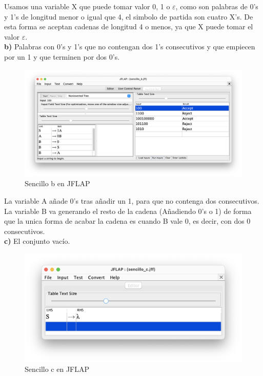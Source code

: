 Usamos una variable X que puede tomar valor 0, 1 o $\varepsilon$, como son palabras de 0's y 1's de longitud menor o igual que 4, 
el simbolo de partida son cuatro X's. De esta forma se aceptan cadenas de longitud 4 o menos, ya que X puede tomar el valor $\varepsilon$. \\

\textbf{b)}  Palabras con 0's y 1's que no contengan dos 1's consecutivos y que empiecen por un 1 y que terminen por dos 0's.

\begin{figure}[H] 
	\centering
	\includegraphics[scale=0.35]{../practica_1/images/sencillo_b.png} 
	\caption{Sencillo b en JFLAP} 
    \label{fig:sencillo_b}
\end{figure}

La variable A añade 0's tras añadir un 1, para que no contenga dos consecutivos. La variable B va generando el resto de la cadena (Añadiendo 0's o 1)
de forma que la unica forma de acabar la cadena es cuando B vale 0, es decir, con dos 0 consecutivos. 
\\

\textbf{c)}  El conjunto vacío. 

\begin{figure}[H] 
	\centering
	\includegraphics[scale=0.5]{../practica_1/images/sencillo_c.png} 
	\caption{Sencillo c en JFLAP} 
    \label{fig:sencillo_c}
\end{figure}

